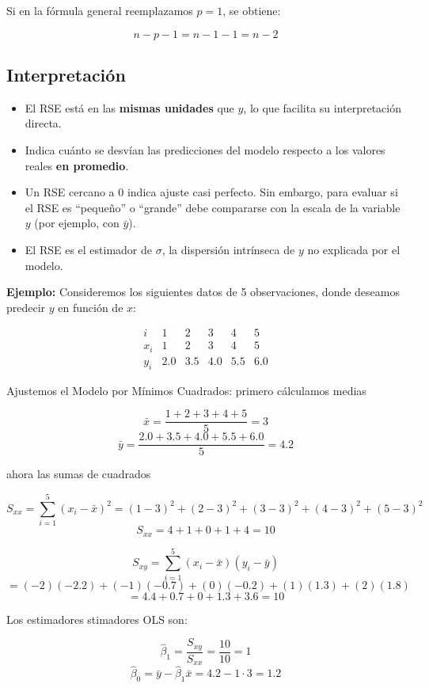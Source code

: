 \documentclass[12pt, a4paper]{article}
\begin{document}
Si en la fórmula general reemplazamos $p=1$, se obtiene:

$$
n-p-1=n-1-1=n-2
$$
\subsection{Interpretación}

\begin{itemize}
  \item El RSE está en las \textbf{mismas unidades} que $y$, lo que facilita
        su interpretación directa.
  \item Indica cuánto se desvían las predicciones del modelo respecto a los
        valores reales \textbf{en promedio}.
  \item Un RSE cercano a 0 indica ajuste casi perfecto. Sin embargo, para
        evaluar si el RSE es ``pequeño'' o ``grande'' debe compararse con la
        escala de la variable $y$ (por ejemplo, con $\bar{y}$).
  \item El RSE es el estimador de $\sigma$, la dispersión intrínseca de $y$
        no explicada por el modelo.
\end{itemize}

\textbf{Ejemplo:}
Consideremos los siguientes datos de 5 observaciones, donde deseamos predecir $y$ en función de $x$:

\[
\begin{array}{c|ccccc}
i & 1 & 2 & 3 & 4 & 5 \\
\hline
x_i & 1 & 2 & 3 & 4 & 5 \\
y_i & 2.0 & 3.5 & 4.0 & 5.5 & 6.0
\end{array}
\]

Ajustemos el Modelo por Mínimos Cuadrados: primero cálculamos  medias

\[
\bar{x} = \frac{1+2+3+4+5}{5} = 3
\]
\[
\bar{y} = \frac{2.0 + 3.5 + 4.0 + 5.5 + 6.0}{5} = 4.2
\]

ahora las sumas de cuadrados

\[
S_{xx} = \sum_{i=1}^{5} (x_i - \bar{x})^2 = (1-3)^2 + (2-3)^2 + (3-3)^2 + (4-3)^2 + (5-3)^2
\]
\[
S_{xx} = 4 + 1 + 0 + 1 + 4 = 10
\]

\[
S_{xy} = \sum_{i=1}^{5} (x_i - \bar{x})(y_i - \bar{y})
\]
\[
= (-2)(-2.2) + (-1)(-0.7) + (0)(-0.2) + (1)(1.3) + (2)(1.8)
\]
\[
= 4.4 + 0.7 + 0 + 1.3 + 3.6 = 10
\]

Los estimadores stimadores OLS son:

\[
\hat{\beta}_1 = \frac{S_{xy}}{S_{xx}} = \frac{10}{10} = 1
\]
\[
\hat{\beta}_0 = \bar{y} - \hat{\beta}_1 \bar{x} = 4.2 - 1 \cdot 3 = 1.2
\]
\end{document}
